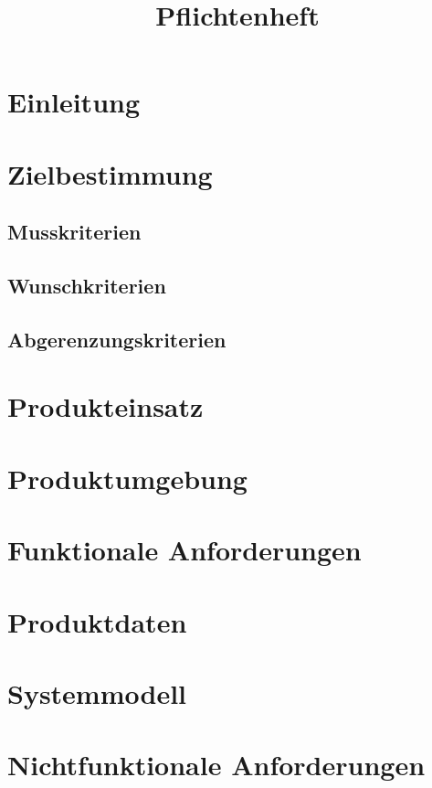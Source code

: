 \documentclass[a4paper, 11pt]{article}
\title{Pflichtenheft}
\begin{document}

\maketitle
\newpage
\tableofcontents
\newpage


\section{Einleitung}

\section{Zielbestimmung}
\subsection{Musskriterien}

\subsection{Wunschkriterien}

\subsection{Abgerenzungskriterien}


\section{Produkteinsatz}

\section{Produktumgebung}

\section{Funktionale Anforderungen}

\section{Produktdaten}

\section{Systemmodell}

\section{Nichtfunktionale Anforderungen}
\end{document}
